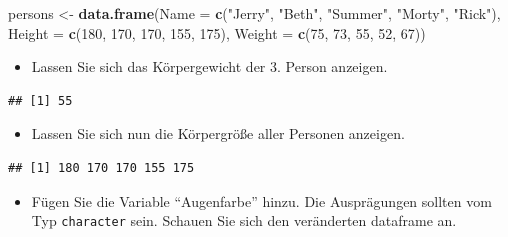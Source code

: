 \documentclass[12pt,a4paper]{article}
\newenvironment{Shaded}{\begin{snugshade}}{\end{snugshade}}
\newcommand{\AttributeTok}[1]{\textcolor[rgb]{0.13,0.29,0.53}{#1}}
\newcommand{\DecValTok}[1]{\textcolor[rgb]{0.00,0.00,0.81}{#1}}
\newcommand{\FunctionTok}[1]{\textcolor[rgb]{0.13,0.29,0.53}{\textbf{#1}}}
\newcommand{\NormalTok}[1]{#1}
\newcommand{\OtherTok}[1]{\textcolor[rgb]{0.56,0.35,0.01}{#1}}
\newcommand{\SpecialCharTok}[1]{\textcolor[rgb]{0.81,0.36,0.00}{\textbf{#1}}}
\newcommand{\StringTok}[1]{\textcolor[rgb]{0.31,0.60,0.02}{#1}}
\begin{document}
\begin{Shaded}
\begin{Highlighting}[]
\NormalTok{    persons }\OtherTok{\textless{}{-}} \FunctionTok{data.frame}\NormalTok{(}\AttributeTok{Name   =} \FunctionTok{c}\NormalTok{(}\StringTok{"Jerry"}\NormalTok{, }\StringTok{"Beth"}\NormalTok{, }\StringTok{"Summer"}\NormalTok{, }\StringTok{"Morty"}\NormalTok{, }\StringTok{"Rick"}\NormalTok{),}
                          \AttributeTok{Height =} \FunctionTok{c}\NormalTok{(}\DecValTok{180}\NormalTok{, }\DecValTok{170}\NormalTok{, }\DecValTok{170}\NormalTok{, }\DecValTok{155}\NormalTok{, }\DecValTok{175}\NormalTok{),}
                          \AttributeTok{Weight =} \FunctionTok{c}\NormalTok{(}\DecValTok{75}\NormalTok{, }\DecValTok{73}\NormalTok{, }\DecValTok{55}\NormalTok{, }\DecValTok{52}\NormalTok{, }\DecValTok{67}\NormalTok{))}
\end{Highlighting}
\end{Shaded}

\begin{itemize}
  \item Lassen Sie sich das Körpergewicht der 3. Person anzeigen.
\end{itemize}

\begin{Shaded}
\end{Shaded}

\begin{verbatim}
## [1] 55
\end{verbatim}

\begin{itemize}
  \item Lassen Sie sich nun die Körpergröße aller Personen anzeigen.
\end{itemize}

\begin{Shaded}
\end{Shaded}

\begin{verbatim}
## [1] 180 170 170 155 175
\end{verbatim}

\begin{itemize}
  \item Fügen Sie die Variable “Augenfarbe” hinzu. Die Ausprägungen sollten vom Typ \texttt{character} sein. Schauen Sie sich den veränderten dataframe an.
\end{itemize}
\end{document}
